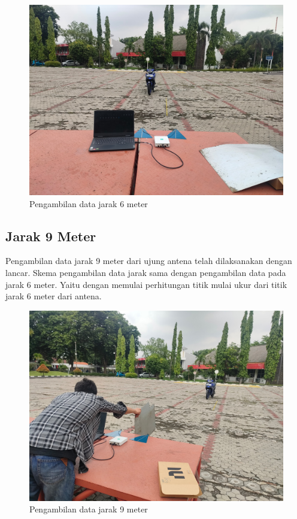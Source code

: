 \begin{figure}
	\centering
	\includegraphics[scale=0.07]{pics/bab4/PengujianRange/6/Masuk.jpg}
	\caption{Pengambilan data jarak 6 meter}
	\label{fig:pengambilan6Meter}
\end{figure}

\subsection{Jarak 9 Meter}

Pengambilan data jarak 9 meter dari ujung antena telah dilaksanakan dengan lancar. Skema pengambilan data jarak sama dengan pengambilan data pada jarak 6 meter. Yaitu dengan memulai perhitungan titik mulai ukur dari titik jarak 6 meter dari antena.

\begin{figure}
	\centering
	\includegraphics[scale=0.07]{pics/bab4/PengujianRange/9/Masuk.jpg}
	\caption{Pengambilan data jarak 9 meter}
	\label{fig:pengambilan9Meter}
\end{figure}
